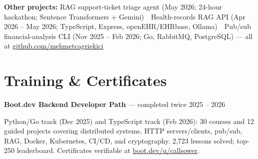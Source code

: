 \documentclass[10pt,a4paper]{article}
\begin{document}
\vspace{3pt}
\textbf{Other projects:} RAG support-ticket triage agent (May 2026; 24-hour hackathon; Sentence Transformers + Gemini) \,\textbullet\, Health-records RAG API (Apr 2026 -- May 2026; TypeScript, Express, openEHR/EHRbase, Ollama) \,\textbullet\, Pub/sub financial-analysis CLI (Nov 2025 -- Feb 2026; Go, RabbitMQ, PostgreSQL) --- all at \href{https://github.com/mehmetcagriekici}{github.com/mehmetcagriekici}

\section{Training \& Certificates}
\textbf{Boot.dev Backend Developer Path} --- completed twice \hfill 2025 -- 2026\par
Python/Go track (Dec 2025) and TypeScript track (Feb 2026): 30 courses and 12 guided projects covering distributed systems, HTTP servers/clients, pub/sub, RAG, Docker, Kubernetes, CI/CD, and cryptography. 2,723 lessons solved; top-250 leaderboard. Certificates verifiable at \href{https://www.boot.dev/u/callsower}{boot.dev/u/callsower}.
\end{document}
